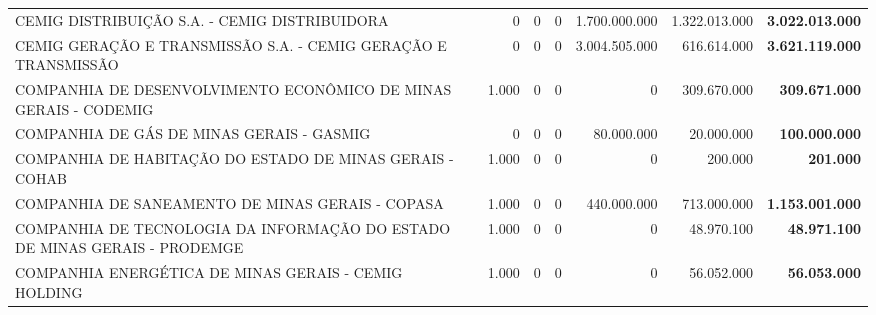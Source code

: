 \documentclass{article}
\begin{document}
\begin{longtable}[c]{m{3cm}|m{2cm}|m{2cm}|m{2cm}|m{2cm}|m{2cm}|m{2cm}}
\multicolumn{1}{L{4cm}|}{CEMIG DISTRIBUIÇÃO S.A. - CEMIG DISTRIBUIDORA} & \multicolumn{1}{r|}{     0} & \multicolumn{1}{r|}{     0} & \multicolumn{1}{r|}{0} & \multicolumn{1}{r|}{1.700.000.000} & \multicolumn{1}{r|}{1.322.013.000} & \multicolumn{1}{r}{ \textbf{3.022.013.000}} \\
\multicolumn{1}{L{4cm}|}{CEMIG GERAÇÃO E TRANSMISSÃO S.A. - CEMIG GERAÇÃO E TRANSMISSÃO} & \multicolumn{1}{r|}{     0} & \multicolumn{1}{r|}{     0} & \multicolumn{1}{r|}{0} & \multicolumn{1}{r|}{3.004.505.000} & \multicolumn{1}{r|}{  616.614.000} & \multicolumn{1}{r}{ \textbf{3.621.119.000}} \\
\multicolumn{1}{L{4cm}|}{COMPANHIA DE DESENVOLVIMENTO ECONÔMICO DE MINAS GERAIS - CODEMIG} & \multicolumn{1}{r|}{ 1.000} & \multicolumn{1}{r|}{     0} & \multicolumn{1}{r|}{0} & \multicolumn{1}{r|}{            0} & \multicolumn{1}{r|}{  309.670.000} & \multicolumn{1}{r}{ \textbf{  309.671.000}} \\
\multicolumn{1}{L{4cm}|}{COMPANHIA DE GÁS DE MINAS GERAIS - GASMIG} & \multicolumn{1}{r|}{     0} & \multicolumn{1}{r|}{     0} & \multicolumn{1}{r|}{0} & \multicolumn{1}{r|}{   80.000.000} & \multicolumn{1}{r|}{   20.000.000} & \multicolumn{1}{r}{ \textbf{  100.000.000}} \\
\multicolumn{1}{L{4cm}|}{COMPANHIA DE HABITAÇÃO DO ESTADO DE MINAS GERAIS - COHAB} & \multicolumn{1}{r|}{ 1.000} & \multicolumn{1}{r|}{     0} & \multicolumn{1}{r|}{0} & \multicolumn{1}{r|}{            0} & \multicolumn{1}{r|}{      200.000} & \multicolumn{1}{r}{ \textbf{      201.000}} \\
\multicolumn{1}{L{4cm}|}{COMPANHIA DE SANEAMENTO DE MINAS GERAIS - COPASA} & \multicolumn{1}{r|}{ 1.000} & \multicolumn{1}{r|}{     0} & \multicolumn{1}{r|}{0} & \multicolumn{1}{r|}{  440.000.000} & \multicolumn{1}{r|}{  713.000.000} & \multicolumn{1}{r}{ \textbf{1.153.001.000}} \\
\multicolumn{1}{L{4cm}|}{COMPANHIA DE TECNOLOGIA DA INFORMAÇÃO DO ESTADO DE MINAS GERAIS - PRODEMGE} & \multicolumn{1}{r|}{ 1.000} & \multicolumn{1}{r|}{     0} & \multicolumn{1}{r|}{0} & \multicolumn{1}{r|}{            0} & \multicolumn{1}{r|}{   48.970.100} & \multicolumn{1}{r}{ \textbf{   48.971.100}} \\
\multicolumn{1}{L{4cm}|}{COMPANHIA ENERGÉTICA DE MINAS GERAIS - CEMIG HOLDING} & \multicolumn{1}{r|}{ 1.000} & \multicolumn{1}{r|}{     0} & \multicolumn{1}{r|}{0} & \multicolumn{1}{r|}{            0} & \multicolumn{1}{r|}{   56.052.000} & \multicolumn{1}{r}{ \textbf{   56.053.000}} \\

\end{longtable}
\end{document}
